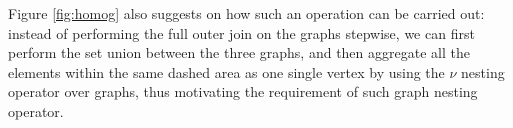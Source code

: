 %
%
%
%
%


Figure \ref{fig:homog} also suggests on how such an operation can be carried out: instead of performing the full outer join on the graphs stepwise, we can first perform the set union between the three graphs, and then aggregate all the elements within the same dashed area as one single vertex by using the $\nu$ nesting operator over graphs, thus motivating the requirement of such graph nesting operator.
